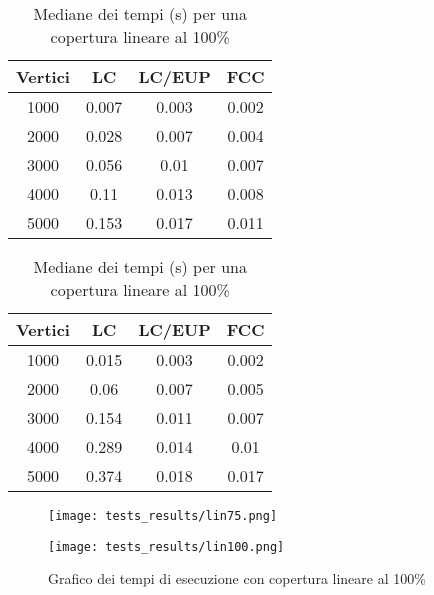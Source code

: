 \begin{table}[!h]
    \parbox{.48\linewidth}{
        \begin{tabular}{|c|c|c|c|}
            \hline
            Vertici & LC    & LC/EUP & FCC   \\ \hline
            1000    & 0.007 & 0.003  & 0.002 \\ \hline
            2000    & 0.028 & 0.007  & 0.004 \\ \hline
            3000    & 0.056 & 0.01   & 0.007 \\ \hline
            4000    & 0.11  & 0.013  & 0.008 \\ \hline
            5000    & 0.153 & 0.017  & 0.011 \\ \hline
        \end{tabular}
        \centering
        \captionsetup{justification=centering}
        \caption{Mediane dei tempi (s) per una copertura lineare al 75\%}
    }
    \hfill
    \parbox{.48\linewidth}{
        \centering
        \captionsetup{justification=centering}
        \begin{tabular}{|c|c|c|c|}
            \hline
            Vertici & LC    & LC/EUP & FCC   \\ \hline
            1000    & 0.015 & 0.003  & 0.002 \\ \hline
            2000    & 0.06  & 0.007  & 0.005 \\ \hline
            3000    & 0.154 & 0.011  & 0.007 \\ \hline
            4000    & 0.289 & 0.014  & 0.01  \\ \hline
            5000    & 0.374 & 0.018  & 0.017 \\ \hline
        \end{tabular}
        \caption{Mediane dei tempi (s) per una copertura lineare al 100\%}
    }
\end{table}

\begin{figure}[!h]
    \begin{adjustbox}{center}
        \begin{minipage}{0.65\textwidth}
            \centering
            \captionsetup{justification=centering}
            \texttt{[image: tests\_results/lin75.png]}
            \caption{Grafico dei tempi di esecuzione con copertura lineare al 75\%}
            \label{fig:lin75}
        \end{minipage}\hfill
        \begin{minipage}{0.65\textwidth}
            \centering
            \captionsetup{justification=centering}
            \texttt{[image: tests\_results/lin100.png]}
            \caption{Grafico dei tempi di esecuzione con copertura lineare al 100\%}
            \label{fig:lin100}
        \end{minipage}
    \end{adjustbox}
\end{figure}
\newpage

